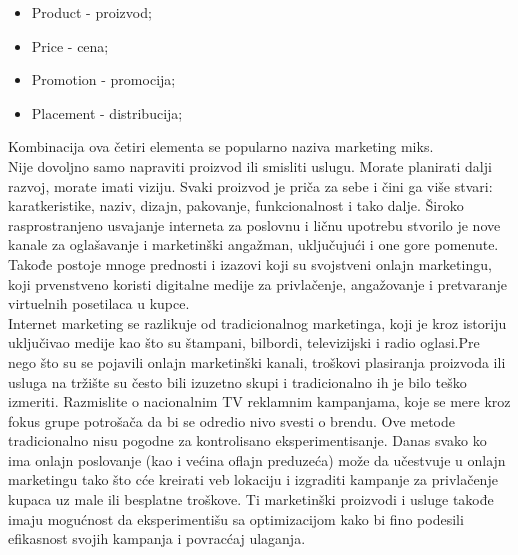 \documentclass[a4paper]{article}
\begin{document}
{\begin{itemize}
    \item Product - proizvod;
    \item Price - cena;
    \item Promotion - promocija;
    \item Placement - distribucija;
    \label{item:uvod}
\end{itemize}
 Kombinacija ova četiri elementa se popularno naziva marketing miks.
\\ Nije dovoljno samo napraviti proizvod ili smisliti uslugu. Morate planirati dalji razvoj, morate imati viziju. Svaki proizvod je priča za sebe i čini ga više stvari: karatkeristike, naziv, dizajn, pakovanje, funkcionalnost i tako dalje.
\newpage
Široko rasprostranjeno usvajanje interneta za poslovnu i ličnu upotrebu stvorilo je nove kanale za oglašavanje i marketinški anga\v{z}man, uključuju\'{c}i i one gore pomenute. Takođe postoje mnoge prednosti i izazovi koji su svojstveni onlajn marketingu, koji prvenstveno koristi digitalne medije za privlačenje, angažovanje i pretvaranje virtuelnih posetilaca u kupce.\\
Internet marketing se razlikuje od tradicionalnog marketinga, koji je kroz istoriju uključivao medije kao što su štampani, bilbordi, televizijski i radio oglasi.Pre nego što su se pojavili onlajn marketinški kanali, troškovi plasiranja proizvoda ili usluga na tržište su često bili izuzetno skupi i tradicionalno ih je bilo teško izmeriti. Razmislite o nacionalnim TV reklamnim kampanjama, koje se mere kroz fokus grupe potrošača da bi se odredio nivo svesti o brendu. Ove metode tradicionalno nisu pogodne za kontrolisano eksperimentisanje. Danas svako ko ima onlajn poslovanje (kao i ve\'{c}ina oflajn preduze\'{c}a) može da učestvuje u onlajn marketingu tako što c\'{c}e kreirati veb lokaciju i izgraditi kampanje za privlačenje kupaca uz male ili besplatne troškove. Ti marketinški proizvodi i usluge takođe imaju mogu\'{c}nost da eksperimentišu sa optimizacijom kako bi fino podesili efikasnost svojih kampanja i povrac\'{c}aj ulaganja.\\

}
\end{document}
